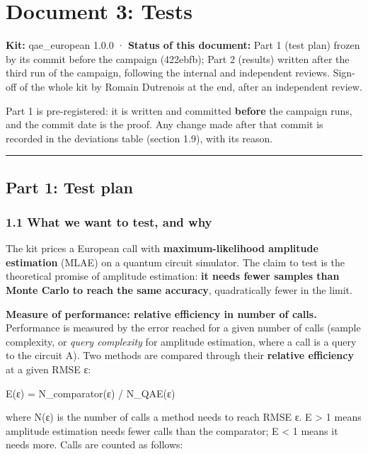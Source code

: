 \documentclass[
  10pt,
]{article}
\author{}
\date{}
\begin{document}
\hypertarget{document-3-tests}{%
\section{Document 3: Tests}\label{document-3-tests}}

\textbf{Kit:} qae\_european 1.0.0 · \textbf{Status of this document:}
Part 1 (test plan) frozen by its commit before the campaign (422ebfb);
Part 2 (results) written after the third run of the campaign, following
the internal and independent reviews. Sign-off of the whole kit by
Romain Dutrenois at the end, after an independent review.

Part 1 is pre-registered: it is written and committed \textbf{before}
the campaign runs, and the commit date is the proof. Any change made
after that commit is recorded in the deviations table (section 1.9),
with its reason.

\begin{center}\rule{0.5\linewidth}{0.5pt}\end{center}

\hypertarget{part-1-test-plan}{%
\subsection{Part 1: Test plan}\label{part-1-test-plan}}

\hypertarget{11-what-we-want-to-test-and-why}{%
\subsubsection{1.1 What we want to test, and
why}\label{11-what-we-want-to-test-and-why}}

The kit prices a European call with \textbf{maximum-likelihood amplitude
estimation} (MLAE) on a quantum circuit simulator. The claim to test is
the theoretical promise of amplitude estimation: \textbf{it needs fewer
samples than Monte Carlo to reach the same accuracy}, quadratically
fewer in the limit.

\textbf{Measure of performance: relative efficiency in number of calls.}
Performance is measured by the error reached for a given number of calls
(sample complexity, or \emph{query complexity} for amplitude estimation,
where a call is a query to the circuit A). Two methods are compared
through their \textbf{relative efficiency} at a given RMSE ε:

E(ε) = N\_comparator(ε) / N\_QAE(ε)

where N(ε) is the number of calls a method needs to reach RMSE ε. E
\textgreater{} 1 means amplitude estimation needs fewer calls than the
comparator; E \textless{} 1 means it needs more. Calls are counted as
follows:
\end{document}
